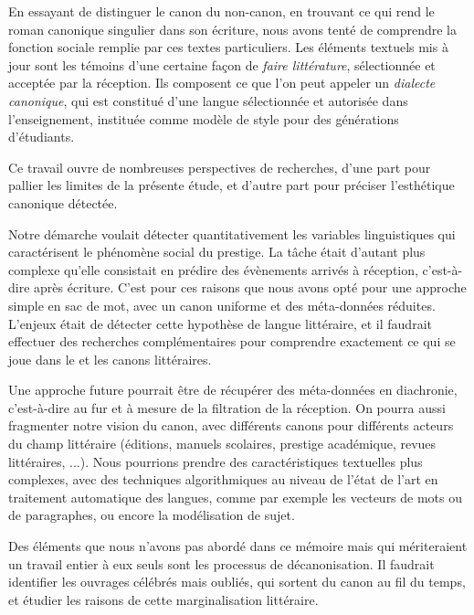 En essayant de distinguer le canon du non-canon, en trouvant ce qui rend le roman canonique singulier dans son écriture, nous avons tenté de comprendre la fonction sociale remplie par ces textes particuliers. Les éléments textuels mis à jour sont les témoins d'une certaine façon de \textit{faire littérature}, sélectionnée et acceptée par la réception. Ils composent ce que l'on peut appeler un \textit{dialecte canonique}, qui est constitué d'une langue sélectionnée et autorisée dans l'enseignement, instituée comme modèle de style pour des générations d'étudiants.

Ce travail ouvre de nombreuses perspectives de recherches, d'une part pour pallier les limites de la présente étude, et d'autre part pour préciser l'esthétique canonique détectée. 

Notre démarche voulait détecter quantitativement les variables linguistiques qui caractérisent le phénomène social du prestige. La tâche était d'autant plus complexe qu'elle consistait en prédire des évènements arrivés à réception, c'est-à-dire après écriture. C'est pour ces raisons que nous avons opté pour une approche simple en sac de mot, avec un canon uniforme et des méta-données réduites. L'enjeux était de détecter cette hypothèse de langue littéraire, et il faudrait effectuer des recherches complémentaires pour comprendre exactement ce qui se joue dans le et les canons littéraires.

Une approche future pourrait être de récupérer des méta-données en diachronie, c'est-à-dire au fur et à mesure de la filtration de la réception. On pourra aussi fragmenter notre vision du canon, avec différents canons pour différents acteurs du champ littéraire (éditions, manuels scolaires, prestige académique, revues littéraires, ...). Nous pourrions prendre des caractéristiques textuelles plus complexes, avec des techniques algorithmiques au niveau de l'état de l'art en traitement automatique des langues, comme par exemple les vecteurs de mots ou de paragraphes, ou encore la modélisation de sujet. 

Des éléments que nous n'avons pas abordé dans ce mémoire mais qui mériteraient un travail entier à eux seuls sont les processus de décanonisation. Il faudrait identifier les ouvrages célébrés mais oubliés, qui sortent du canon au fil du temps, et étudier les raisons de cette marginalisation littéraire. 







